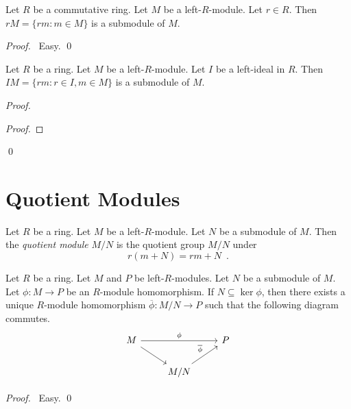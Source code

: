 \begin{prop}
Let $R$ be a commutative ring. Let $M$ be a left-$R$-module. Let $r \in R$. Then $rM = \{ rm : m \in M \}$ is a submodule of $M$.
\end{prop}

\begin{proof}
\pf\ Easy. \qed
\end{proof}

\begin{prop}
Let $R$ be a ring. Let $M$ be a left-$R$-module. Let $I$ be a left-ideal in $R$. Then $IM = \{ rm : r \in I, m \in M \}$ is a submodule of $M$.
\end{prop}

\begin{proof}
\pf
{}
\begin{proof}
\end{proof}
\qed
\end{proof}

\section{Quotient Modules}

\begin{df}
Let $R$ be a ring. Let $M$ be a left-$R$-module. Let $N$ be a submodule of $M$. Then the \emph{quotient module} $M/N$ is the quotient group $M/N$ under
\[ r(m+N) = rm+N \enspace . \]
\end{df}

\begin{prop}
Let $R$ be a ring. Let $M$ and $P$ be left-$R$-modules. Let $N$ be a submodule of $M$. Let $\phi : M \rightarrow P$ be an $R$-module homomorphism. If $N \subseteq \ker \phi$, then there exists a unique $R$-module homomorphism $\overline{\phi} : M / N \rightarrow P$ such that the following diagram commutes.
\[ \begin{tikzcd}
M \arrow[rr,"\phi"] \arrow[dr] & & P \\
& M/N \arrow[ur,"\overline{\phi}"]
\end{tikzcd} \]
\end{prop}

\begin{proof}
\pf\ Easy. \qed
\end{proof}

